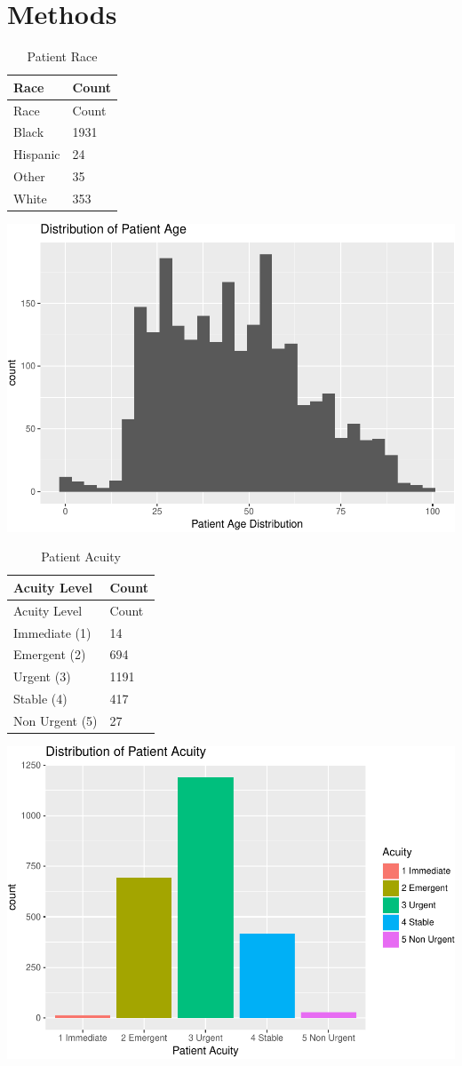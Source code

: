 \documentclass[]{elsarticle} %
\makeatletter
\def\maxwidth{\ifdim\Gin@nat@width>\linewidth\linewidth
\else\Gin@nat@width\fi}
\let\Oldincludegraphics\includegraphics
\renewcommand{\includegraphics}[1]{\Oldincludegraphics[width=\maxwidth]{#1}}
\makeatother
\begin{document}
\section{Methods}\label{methods}

\begin{longtable}[]{@{}ll@{}}
\caption{Patient Race}\tabularnewline
\toprule
Race & Count\tabularnewline
\midrule
\endfirsthead
\toprule
Race & Count\tabularnewline
\midrule
\endhead
Black & 1931\tabularnewline
Hispanic & 24\tabularnewline
Other & 35\tabularnewline
White & 353\tabularnewline
\bottomrule
\end{longtable}

\includegraphics{Flynn_Project_files/figure-latex/Participants-1.pdf}

\begin{longtable}[]{@{}ll@{}}
\caption{Patient Acuity}\tabularnewline
\toprule
Acuity Level & Count\tabularnewline
\midrule
\endfirsthead
\toprule
Acuity Level & Count\tabularnewline
\midrule
\endhead
Immediate (1) & 14\tabularnewline
Emergent (2) & 694\tabularnewline
Urgent (3) & 1191\tabularnewline
Stable (4) & 417\tabularnewline
Non Urgent (5) & 27\tabularnewline
\bottomrule
\end{longtable}

\includegraphics{Flynn_Project_files/figure-latex/Participants-2.pdf}
\end{document}
